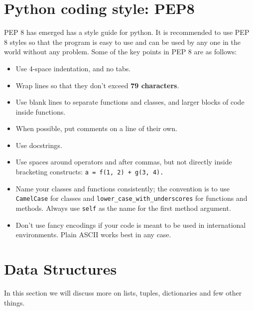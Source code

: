 \documentclass[12pt,a4paper]{article}
\begin{document}
\section{Python coding style: PEP8}
PEP 8 has emerged has a style guide for python. It is recommended to use PEP 8 styles so that the program is easy to use and can be used by any one in the world without any problem. Some of the key points in PEP 8 are as follows:
\begin{itemize}
\item Use 4-space indentation, and no tabs.
\item Wrap lines so that they don’t exceed \textbf{79 characters}.
\item Use blank lines to separate functions and classes, and larger blocks of code inside functions.
\item When possible, put comments on a line of their own.
\item Use docstrings.
\item Use spaces around operators and after commas, but not directly inside bracketing constructs: \texttt{a = f(1, 2) + g(3, 4).}
\item Name your classes and functions consistently; the convention is to use \texttt{CamelCase} for classes and \texttt{lower\_case\_with\_underscores} for functions and methods. Always use \texttt{self} as the name for the first method argument.
\item Don’t use fancy encodings if your code is meant to be used in international environments. Plain ASCII works best in any case. 
\end{itemize}

\section{Data Structures}
In this section we will discuss more on lists, tuples, dictionaries and few other things.
\end{document}
